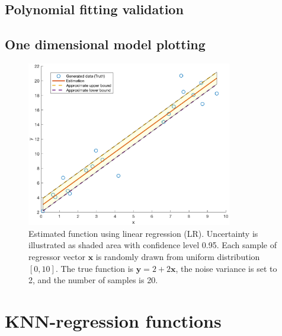 \documentclass[]{article}
\begin{document}
\subsection{Polynomial fitting validation}

\subsection{One dimensional model plotting}
\begin{figure}[H]
	\caption{Estimated function using linear regression (LR). Uncertainty is illustrated as shaded area with confidence level 0.95. Each sample of regressor vector $\mathbf{x}$ is randomly drawn from uniform distribution $[0,10]$. The true function is $\mathbf{y}=2+2\mathbf{x}$, the noise variance is set to 2, and the number of samples is 20. }
	\centering
	\includegraphics[width=0.8\textwidth]{project1e.eps}
\end{figure}

\section{KNN-regression functions}
\end{document}
